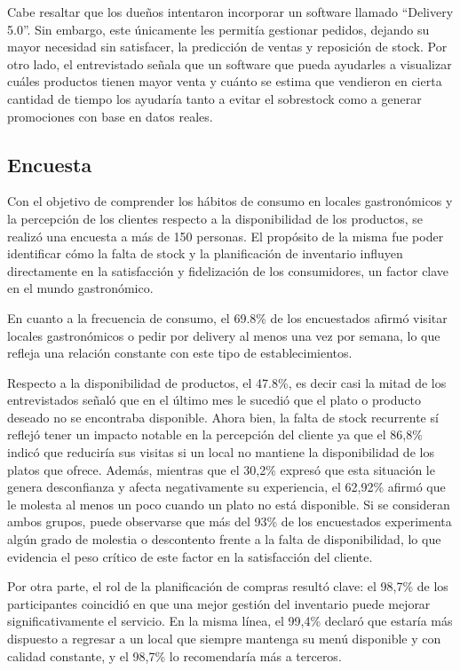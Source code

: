 Cabe resaltar que los dueños intentaron incorporar un software llamado “Delivery 5.0”. Sin embargo, este únicamente les permitía gestionar pedidos, dejando su mayor necesidad sin satisfacer, la predicción de ventas y reposición de stock. Por otro lado, el entrevistado señala que un software que pueda ayudarles a visualizar cuáles productos tienen mayor venta y cuánto se estima que vendieron en cierta cantidad de tiempo los ayudaría tanto a evitar el sobrestock como a generar promociones con base en datos reales.

\subsection{Encuesta}\label{sec:encuesta}

Con el objetivo de comprender los hábitos de consumo en locales gastronómicos y la percepción de los clientes respecto a la disponibilidad de los productos, se realizó una encuesta a más de 150 personas. El propósito de la misma fue poder identificar cómo la falta de stock y la planificación de inventario influyen directamente en la satisfacción y fidelización de los consumidores, un factor clave en el mundo gastronómico.

En cuanto a la frecuencia de consumo, el 69.8\% de los encuestados afirmó visitar locales gastronómicos o pedir por delivery al menos una vez por semana, lo que refleja una relación constante con este tipo de establecimientos.

Respecto a la disponibilidad de productos, el 47.8\%, es decir casi la mitad de los entrevistados señaló que en el último mes le sucedió que el plato o producto deseado no se encontraba disponible. Ahora bien, la falta de stock recurrente sí reflejó tener un impacto notable en la percepción del cliente ya que el 86,8\% indicó que reduciría sus visitas si un local no mantiene la disponibilidad de los platos que ofrece. Además, mientras que el 30,2\% expresó que esta situación le genera desconfianza y afecta negativamente su experiencia, el 62,92\% afirmó que le molesta al menos un poco cuando un plato no está disponible. Si se consideran ambos grupos, puede observarse que más del 93\% de los encuestados experimenta algún grado de molestia o descontento frente a la falta de disponibilidad, lo que evidencia el peso crítico de este factor en la satisfacción del cliente.

Por otra parte, el rol de la planificación de compras resultó clave: el 98,7\% de los participantes coincidió en que una mejor gestión del inventario puede mejorar significativamente el servicio. En la misma línea, el 99,4\% declaró que estaría más dispuesto a regresar a un local que siempre mantenga su menú disponible y con calidad constante, y el 98,7\% lo recomendaría más a terceros.

